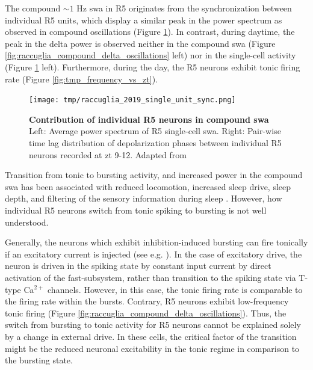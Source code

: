 \documentclass[../main.tex]{subfiles}
\begin{document}
The compound $\sim 1$ Hz \gls{swa} in R5 originates from the synchronization between individual R5 units, which display a similar peak in the power spectrum as observed in compound oscillations \parencite{raccugliaNetworkSpecificSynchronizationElectrical2019} (Figure \ref{fig:tmp_single_unit_r5_day_night}).
In contrast, during daytime, the peak in the delta power is observed neither in the compound \gls{swa} (Figure \ref{fig:raccuglia_compound_delta_oscillations} left) nor in the single-cell activity (Figure \ref{fig:tmp_single_unit_r5_day_night} left).
Furthermore, during the day, the R5 neurons exhibit tonic firing rate (Figure \ref{fig:tmp_frequency_vs_zt}).

\begin{figure}[!t]
    \centering
    \texttt{[image: tmp/raccuglia\_2019\_single\_unit\_sync.png]}
    \caption[Contribution of individual R5 neurons in compound \gls{swa}]{
        \textbf{Contribution of individual R5 neurons in compound \gls{swa}}
        Left: Average power spectrum of R5 single-cell \gls{swa}.
        Right: Pair-wise time lag distribution of depolarization phases between individual R5 neurons recorded at \gls{zt} 9-12.
        Adapted from \parencite{raccugliaNetworkSpecificSynchronizationElectrical2019}
    }
    \label{fig:tmp_single_unit_r5_day_night}
\end{figure}

Transition from tonic to bursting activity, and increased power in the compound \gls{swa} has been associated with reduced locomotion, increased sleep drive, sleep depth, and filtering of the sensory information during sleep
\parencite{liuSleepDriveEncoded2016,raccugliaNetworkSpecificSynchronizationElectrical2019,
raccugliaCoherentMultilevelNetwork2022,suarez-grimaltNeuralArchitectureSleep2021}.
However, how individual R5 neurons switch from tonic spiking to bursting is not well understood.

Generally, the neurons which exhibit inhibition-induced bursting can fire tonically if an excitatory current is injected (see e.g. \parencite{wangMultipleDynamicalModes1994}).
In the case of excitatory drive, the neuron is driven in the spiking state by constant input current by direct activation of the fast-subsystem, rather than transition to the spiking state via T-type Ca$^{2+}$ channels. However, in this case, the tonic firing rate is comparable to the firing rate within the bursts. Contrary, R5 neurons exhibit low-frequency tonic firing \parencite{raccugliaNetworkSpecificSynchronizationElectrical2019} (Figure \ref{fig:raccuglia_compound_delta_oscillations}).
Thus, the switch from bursting to tonic activity for R5 neurons cannot be explained solely by a change in external drive. In these cells, the critical factor of the transition might be the reduced neuronal excitability in the tonic regime in comparison to the bursting state.
\end{document}
